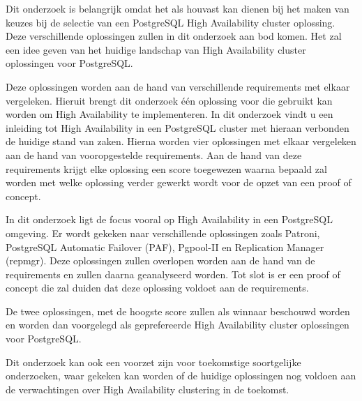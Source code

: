 
Dit onderzoek is belangrijk omdat het als houvast kan dienen bij het maken van keuzes bij de selectie van een PostgreSQL High Availability cluster oplossing. Deze verschillende oplossingen zullen in dit onderzoek aan bod komen. Het zal een idee geven van het huidige landschap van High Availability cluster oplossingen voor PostgreSQL.

Deze oplossingen worden aan de hand van verschillende requirements met elkaar vergeleken. Hieruit brengt dit onderzoek één oplossing voor die gebruikt kan worden om High Availability te implementeren. In dit onderzoek vindt u een inleiding tot High Availability in een PostgreSQL cluster met hieraan verbonden de huidige stand van zaken. Hierna worden vier oplossingen met elkaar vergeleken aan de hand van vooropgestelde requirements. Aan de hand van deze requirements krijgt elke oplossing een score toegewezen waarna bepaald zal worden met welke oplossing verder gewerkt wordt voor de opzet van een proof of concept.

In dit onderzoek ligt de focus vooral op High Availability in een PostgreSQL omgeving. Er wordt gekeken naar verschillende oplossingen zoals Patroni, PostgreSQL Automatic Failover (PAF), Pgpool-II en Replication Manager (repmgr). Deze oplossingen zullen overlopen worden aan de hand van de requirements en zullen daarna geanalyseerd worden. Tot slot is er een proof of concept die zal duiden dat deze oplossing voldoet aan de requirements.

De twee oplossingen, met de hoogste score zullen als winnaar beschouwd worden en worden dan voorgelegd als geprefereerde High Availability cluster oplossingen voor PostgreSQL.

Dit onderzoek kan ook een voorzet zijn voor toekomstige soortgelijke onderzoeken, waar gekeken kan worden of de huidige oplossingen nog voldoen aan de verwachtingen over High Availability clustering in de toekomst.



